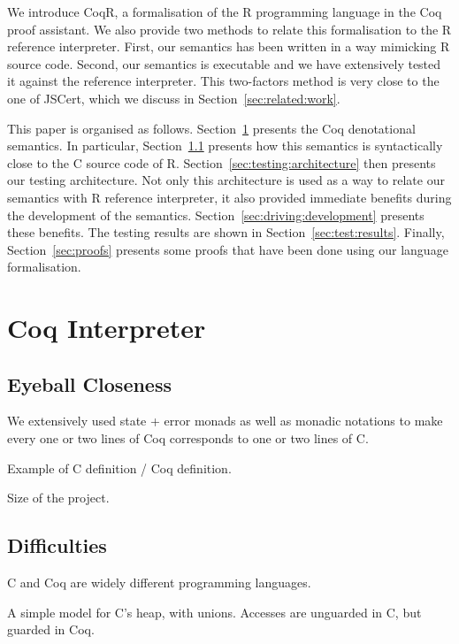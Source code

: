 \documentclass[
    sigplan,
    10pt,
    review, %
    natbib=false %
 ]{acmart}
\newcommand{\mb}[1]{\todo[color=purple!20,size=\scriptsize]{#1}}
\begin{document}
We introduce CoqR\mb{Are we fixed on the name? ☺},
a formalisation of the R programming language in the Coq proof assistant.
We also provide two methods to relate this formalisation
to the R reference interpreter.
First, our semantics has been written in a way mimicking R source code.
Second, our semantics is executable and we have extensively tested it
against the reference interpreter.
%
This two-factors method is very close to the one of JSCert,
which we discuss in Section~\ref{sec:related:work}.

This paper is organised as follows.
Section~\ref{sec:coq:interp} presents the Coq denotational semantics.
In particular, Section~\ref{sec:eyeball:closeness} presents
how this semantics is syntactically close to the C source code of R.
Section~\ref{sec:testing:architecture} then presents our testing architecture.
Not only this architecture is used as a way to relate our semantics
with R reference interpreter,
it also provided immediate benefits during the development of the semantics.
Section~\ref{sec:driving:development} presents these benefits.
The testing results are shown in Section~\ref{sec:test:results}.
Finally, Section~\ref{sec:proofs} presents some proofs that have been done
using our language formalisation.

\section{Coq Interpreter}
\label{sec:coq:interp}

\subsection{Eyeball Closeness}
\label{sec:eyeball:closeness}

We extensively used state + error monads as well as monadic notations
to make every one or two lines of Coq corresponds to one or two lines of C.

Example of C definition / Coq definition.

Size of the project.

\subsection{Difficulties}
\label{sec:coq:difficulties}

C and Coq are widely different programming languages.

A simple model for C’s heap, with unions.
Accesses are unguarded in C, but guarded in Coq.
\end{document}
